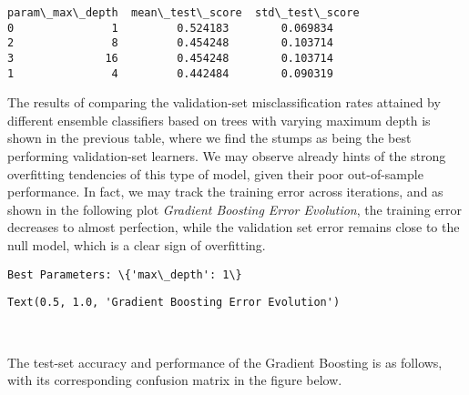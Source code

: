 \documentclass[11pt]{article}
\makeatletter
\newcommand{\boxspacing}{\kern\kvtcb@left@rule\kern\kvtcb@boxsep}
\newcommand{\prompt}[4]{
        {\ttfamily\llap{{\color{#2}[#3]:\hspace{3pt}#4}}\vspace{-\baselineskip}}
    }
\makeatother
\begin{document}
            \begin{tcolorbox}[breakable, size=fbox, boxrule=.5pt, pad at break*=1mm, opacityfill=0]
\prompt{Out}{outcolor}{24}{\boxspacing}
\begin{Verbatim}[commandchars=\\\{\}]
  param\_max\_depth  mean\_test\_score  std\_test\_score
0               1         0.524183        0.069834
2               8         0.454248        0.103714
3              16         0.454248        0.103714
1               4         0.442484        0.090319
\end{Verbatim}
\end{tcolorbox}
        
    The results of comparing the validation-set misclassification rates
attained by different ensemble classifiers based on trees with varying
maximum depth is shown in the previous table, where we find the stumps
as being the best performing validation-set learners. We may observe
already hints of the strong overfitting tendencies of this type of
model, given their poor out-of-sample performance. In fact, we may track
the training error across iterations, and as shown in the following plot
\emph{Gradient Boosting Error Evolution}, the training error decreases
to almost perfection, while the validation set error remains close to
the null model, which is a clear sign of overfitting.


    \begin{Verbatim}[commandchars=\\\{\}]
Best Parameters: \{'max\_depth': 1\}
    \end{Verbatim}

            \begin{tcolorbox}[breakable, size=fbox, boxrule=.5pt, pad at break*=1mm, opacityfill=0]
\prompt{Out}{outcolor}{25}{\boxspacing}
\begin{Verbatim}[commandchars=\\\{\}]
Text(0.5, 1.0, 'Gradient Boosting Error Evolution')
\end{Verbatim}
\end{tcolorbox}
        
    \begin{center}
    \end{center}
    { \hspace*{\fill} \\}
    
    The test-set accuracy and performance of the Gradient Boosting is as
follows, with its corresponding confusion matrix in the figure below.
\end{document}

